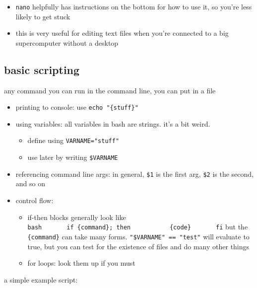 \documentclass[
]{article}
\providecommand{\tightlist}{%
  \setlength{\itemsep}{0pt}\setlength{\parskip}{0pt}}
\begin{document}
\begin{itemize}
  \begin{itemize}
  \tightlist
  \item
    \texttt{nano} helpfully has instructions on the bottom for how to
    use it, so you're less likely to get stuck
  \item
    this is very useful for editing text files when you're connected to
    a big supercomputer without a desktop
  \end{itemize}
\end{itemize}

\hypertarget{basic-scripting}{%
\subsection{basic scripting}\label{basic-scripting}}

any command you can run in the command line, you can put in a file

\begin{itemize}
\tightlist
\item
  printing to console: use \texttt{echo\ "\{stuff\}"}
\item
  using variables: all variables in bash are strings. it's a bit weird.

  \begin{itemize}
  \tightlist
  \item
    define using \texttt{VARNAME="stuff"}
  \item
    use later by writing \texttt{\$VARNAME}
  \end{itemize}
\item
  referencing command line args: in general, \texttt{\$1} is the first
  arg, \texttt{\$2} is the second, and so on
\item
  control flow:

  \begin{itemize}
  \tightlist
  \item
    if-then blocks generally look like
    \texttt{bash\ \ \ \ \ \ \ if\ \{command\};\ then\ \ \ \ \ \ \ \ \ \ \ \{code\}\ \ \ \ \ \ \ fi}
    but the \texttt{\{command\}} can take many forms.
    \texttt{"\$VARNAME"\ ==\ "test"} will evaluate to true, but you can
    test for the existence of files and do many other things
  \item
    for loops: look them up if you must
  \end{itemize}
\end{itemize}

a simple example script:
\end{document}

